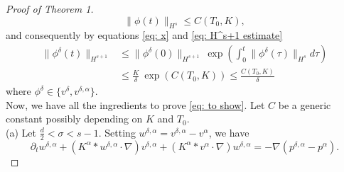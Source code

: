 \documentclass{amsart}
\begin{document}
\begin{proof}[Proof of Theorem 1]
\begin{equation}
\label{eq: phi leq K}
    \|\phi(t)\|_{H^s} \leq C(T_0,K),
\end{equation}
and consequently by equations \eqref{eq: x} and \eqref{eq: H^s+1 estimate}
\begin{equation}
\label{eq: abc}
\begin{aligned}
    \|\phi^{\delta}(t)\|_{H^{s+1}} &\leq \|\phi^{\delta}(0)\|_{H^{s+1}} \ \operatorname{exp}\left(\int_0^t\|\phi^{\delta}(\tau)\|_{H^{s}}d\tau\right) \\
		&\leq  \frac{K}{\delta} \ \operatorname{exp}(C(T_0,K)) \leq \frac{C(T_0,K)}{\delta}
		\end{aligned}
\end{equation}
where $\phi^{\delta} \in \{v^{\delta}, v^{\delta,\alpha}\}$.\\

Now, we have all the ingredients to prove \eqref{eq: to show}. Let $C$ be a generic constant possibly depending on $K$ and $T_0$.\\


(a) Let $\frac d2<\sigma<s-1$. Setting $w^{\delta,\alpha}=v^{\delta, \alpha}-v^{\alpha}$, we have
\begin{equation*}
 \partial_tw^{\delta,\alpha} + (K^{\alpha}*w^{\delta,\alpha} \cdot \nabla)v^{\delta,\alpha} + (K^{\alpha}*v^{\alpha} \cdot \nabla) w^{\delta,\alpha} = -\nabla (p^{\delta,\alpha}-p^{ \alpha}).
\end{equation*}


\end{proof}
\end{document}
